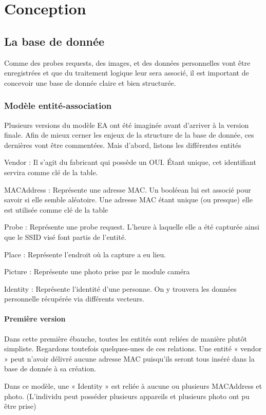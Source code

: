 \chapter{Conception}
\label{ch:conception}

\section{La base de donnée}
\label{sec:database}
Comme des probes requests, des images, et des données personnelles vont être enregistrées et que du traitement
logique leur sera associé, il est important de concevoir une base de donnée claire et bien structurée.

\subsection{Modèle entité-association}
Plusieurs versions du modèle EA ont été imaginée avant d’arriver à la version finale. Afin de mieux cerner les enjeux
de la structure de la base de donnée, ces dernières vont être commentées. Mais d’abord, listons les différentes
entités

Vendor : Il s’agit du fabricant qui possède un OUI. Étant unique, cet identifiant servira comme clé de la table.

MACAddress : Représente une adresse MAC. Un booléean lui est associé pour savoir si elle semble aléatoire. Une
adresse MAC étant unique (ou presque) elle est utilisée comme clé de la table

Probe : Représente une probe request. L’heure à laquelle elle a été capturée ainsi que le SSID visé font partis de
l’entité.

Place : Représente l’endroit où la capture a eu lieu.

Picture : Représente une photo prise par le module caméra

Identity : Représente l’identité d’une personne. On y trouvera les données personnelle récupérée via différents
vecteurs.

\subsubsection{Première version}
Dans cette première ébauche, toutes les entités sont reliées de manière plutôt simpliste. Regardons toutefois
quelques-unes de ces relations.
Une entité « vendor » peut n’avoir délivré aucune adresse MAC puisqu’ils seront tous inséré dans la base de donnée
à sa création.

Dans ce modèle, une « Identity » est reliée à aucune ou plusieurs MACAddress et photo. (L’individu peut posséder
plusieurs appareils et plusieurs photo ont pu être prise)

